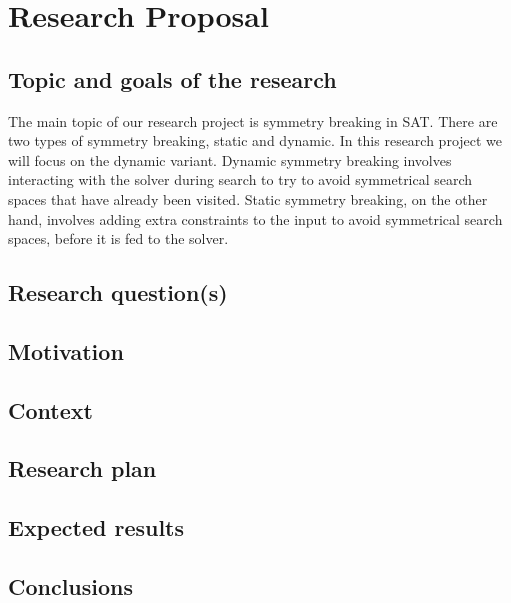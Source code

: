 \section{Research Proposal}
\subsection{Topic and goals of the research}
The main topic of our research project is symmetry breaking in SAT. There are two types of symmetry breaking, static and dynamic. In this research project we will focus on the dynamic variant. Dynamic symmetry breaking involves interacting with the solver during search to try to avoid symmetrical search spaces that have already been visited. Static symmetry breaking, on the other hand, involves adding extra constraints to the input to avoid symmetrical search spaces, before it is fed to the solver.

\subsection{Research question(s)}

\subsection{Motivation} %

\subsection{Context} %

\subsection{Research plan} %

\subsection{Expected results}

\subsection{Conclusions}